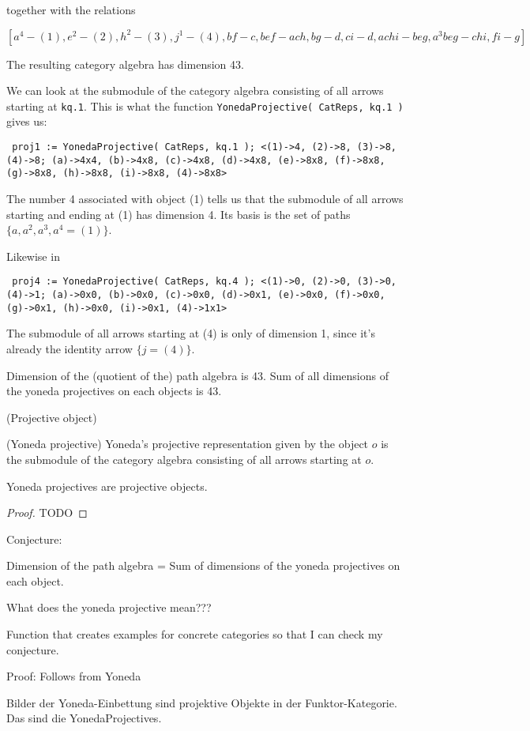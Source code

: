 together with the relations

\[
[a^{4} - (1), e^{2} - (2), h^{2} - (3), j^{1} - (4), bf - c, bef-ach, bg-d, ci-d, achi-beg, a^{3}beg-chi, fi-g]
\]

The resulting category algebra has dimension 43.

We can look at the submodule of the category algebra consisting of all arrows starting at \texttt{kq.1}.
This is what the function \texttt{YonedaProjective( CatReps, kq.1 )} gives us:

\texttt{
proj1 := YonedaProjective( CatReps, kq.1 );
<(1)->4, (2)->8, (3)->8, (4)->8; (a)->4x4, (b)->4x8, (c)->4x8,
(d)->4x8, (e)->8x8, (f)->8x8, (g)->8x8, (h)->8x8, (i)->8x8, (4)->8x8>
}

The number 4 associated with object (1) tells us that the submodule of all arrows starting and ending at (1) has dimension 4.
Its basis is the set of paths $\{a, a^{2}, a^{3}, a^{4} = (1) \}$.

Likewise in

\texttt{
proj4 := YonedaProjective( CatReps, kq.4 );
<(1)->0, (2)->0, (3)->0, (4)->1; (a)->0x0, (b)->0x0, (c)->0x0,
(d)->0x1, (e)->0x0, (f)->0x0, (g)->0x1, (h)->0x0, (i)->0x1, (4)->1x1>
}

The submodule of all arrows starting at (4) is only of dimension 1, since it's already the identity arrow $\{j = (4)\}$.

Dimension of the (quotient of the) path algebra is 43.
Sum of all dimensions of the yoneda projectives on each objects is 43.

\begin{definition}{(Projective object)}

\end{definition}

\begin{definition}{(Yoneda projective)}
Yoneda's projective representation given by the object $o$ is the submodule of the category algebra
consisting of all arrows starting at $o$.
\end{definition}

\begin{thm}
Yoneda projectives are projective objects.
\begin{proof}
TODO
\end{proof}
\end{thm}

Conjecture: 

Dimension of the path algebra = Sum of dimensions of the yoneda projectives on each object.

What does the yoneda projective mean???

Function that creates examples for concrete categories so that I can check my conjecture.

Proof: Follows from Yoneda

Bilder der Yoneda-Einbettung sind projektive Objekte in der Funktor-Kategorie. Das sind die YonedaProjectives.